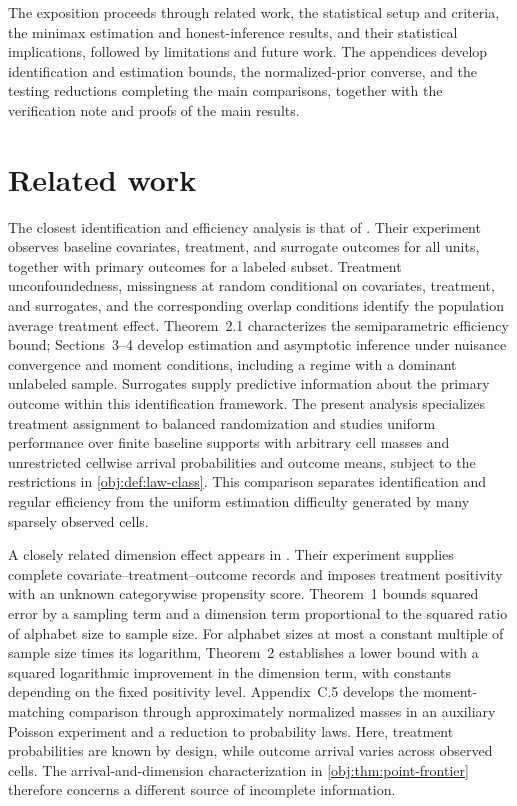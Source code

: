 \documentclass[11pt]{article}
\begin{document}
The exposition proceeds through related work, the statistical setup and criteria, the minimax estimation and honest-inference results, and their statistical implications, followed by limitations and future work. The appendices develop identification and estimation bounds, the normalized-prior converse, and the testing reductions completing the main comparisons, together with the verification note and proofs of the main results.


\section{Related work}

The closest identification and efficiency analysis is that of \citet[Lemma~1.1 under Assumptions~1--3, Theorem~2.1, and Sections~3--4]{KallusMao2025}. Their experiment observes baseline covariates, treatment, and surrogate outcomes for all units, together with primary outcomes for a labeled subset. Treatment unconfoundedness, missingness at random conditional on covariates, treatment, and surrogates, and the corresponding overlap conditions identify the population average treatment effect. Theorem~2.1 characterizes the semiparametric efficiency bound; Sections~3--4 develop estimation and asymptotic inference under nuisance convergence and moment conditions, including a regime with a dominant unlabeled sample. Surrogates supply predictive information about the primary outcome within this identification framework. The present analysis specializes treatment assignment to balanced randomization and studies uniform performance over finite baseline supports with arbitrary cell masses and unrestricted cellwise arrival probabilities and outcome means, subject to the restrictions in \cref{obj:def:law-class}. This comparison separates identification and regular efficiency from the uniform estimation difficulty generated by many sparsely observed cells.

A closely related dimension effect appears in \citet[Theorems~1--2 and Appendix~C.5]{ZengBalakrishnanHanKennedy2024}. Their experiment supplies complete covariate--treatment--outcome records and imposes treatment positivity with an unknown categorywise propensity score. Theorem~1 bounds squared error by a sampling term and a dimension term proportional to the squared ratio of alphabet size to sample size. For alphabet sizes at most a constant multiple of sample size times its logarithm, Theorem~2 establishes a lower bound with a squared logarithmic improvement in the dimension term, with constants depending on the fixed positivity level. Appendix~C.5 develops the moment-matching comparison through approximately normalized masses in an auxiliary Poisson experiment and a reduction to probability laws. Here, treatment probabilities are known by design, while outcome arrival varies across observed cells. The arrival-and-dimension characterization in \cref{obj:thm:point-frontier} therefore concerns a different source of incomplete information.
\end{document}
